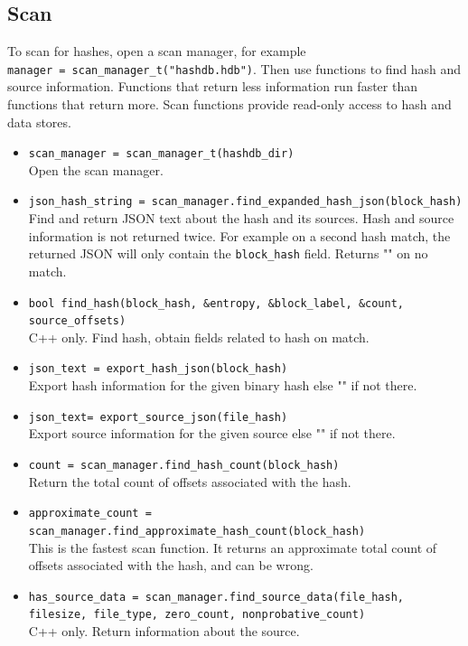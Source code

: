 \documentclass[11pt,fleqn]{article} %
\begin{document}
\subsection{Scan}
To scan for hashes, open a scan manager, for example\\
\verb+manager = scan_manager_t("hashdb.hdb")+. Then use functions to find hash and source information. Functions that return less information run faster than functions that return more. Scan functions provide read-only access to hash and data stores.

\begin{itemize}
\item \verb+scan_manager = scan_manager_t(hashdb_dir)+\\
Open the scan manager.
\item \verb+json_hash_string = scan_manager.find_expanded_hash_json(block_hash)+\\
Find and return JSON text about the hash and its sources. Hash and source information is not returned twice. For example on a second hash match, the returned JSON will only contain the \verb+block_hash+ field. Returns "" on no match.
\item \verb+bool find_hash(block_hash, &entropy, &block_label, &count, source_offsets)+\\
C++ only. Find hash, obtain fields related to hash on match.
\item \verb+json_text = export_hash_json(block_hash)+\\
Export hash information for the given binary hash else "" if not there.
\item \verb+json_text= export_source_json(file_hash)+\\
Export source information for the given source else "" if not there.
\item \verb+count = scan_manager.find_hash_count(block_hash)+\\
Return the total count of offsets associated with the hash.
\item \verb+approximate_count = scan_manager.find_approximate_hash_count(block_hash)+\\
This is the fastest scan function. It returns an approximate total count of offsets associated with the hash, and can be wrong.
\item \verb+has_source_data = scan_manager.find_source_data(file_hash,+\\
\verb+filesize, file_type, zero_count, nonprobative_count)+\\
C++ only. Return information about the source.

\end{itemize}
\end{document}
